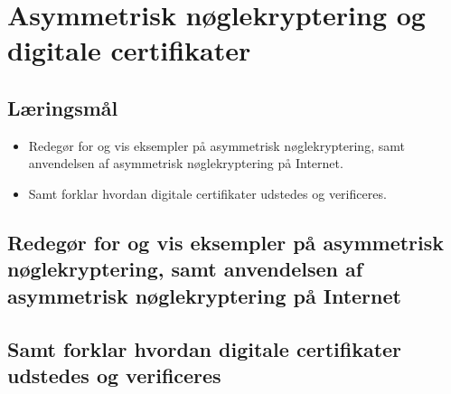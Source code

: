 \section{Asymmetrisk nøglekryptering og digitale certifikater}

\subsection{Læringsmål}

\begin{itemize}
	\item Redegør for og vis eksempler på asymmetrisk nøglekryptering, samt anvendelsen af
	asymmetrisk nøglekryptering på Internet.
	\item Samt forklar hvordan digitale certifikater udstedes og verificeres.
\end{itemize}

\subsection{Redegør for og vis eksempler på asymmetrisk nøglekryptering, samt anvendelsen af asymmetrisk nøglekryptering på Internet}
\subsection{Samt forklar hvordan digitale certifikater udstedes og verificeres}
